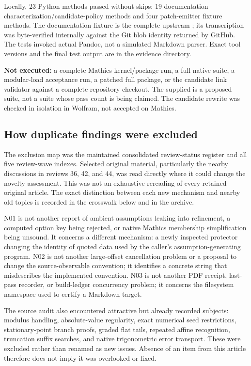 \documentclass[11pt,letterpaper]{article}
\begin{document}
Locally, 23 Python methods passed without skips: 19 documentation
characterization/candidate-policy methods and four patch-emitter fixture
methods. The documentation fixture is the complete upstream
; its transcription was byte-verified
internally against the Git blob identity returned by GitHub. The tests invoked
actual Pandoc, not a simulated Markdown parser. Exact tool versions and the
final test output are in the evidence directory.

\textbf{Not executed:} a complete Mathics kernel/package run, a full native
suite, a modular-load acceptance run, a patched full package, or the candidate
link validator against a complete repository checkout. The supplied
 is a proposed suite, not a suite whose pass
count is being claimed. The candidate rewrite was checked in isolation in
Wolfram, not accepted on Mathics.

\subsection{How duplicate findings were excluded}

The exclusion map was the maintained consolidated review-status register and
all five review-wave indexes. Selected original material, particularly the
nearby discussions in reviews 36, 42, and 44, was read directly where it could
change the novelty assessment. This was not an exhaustive rereading of every
retained original article. The exact distinction between each new mechanism
and nearby old topics is recorded in the crosswalk below and in the archive.
\cite{status,wave3,wave4,wave5,r36,r42,r44}

N01 is not another report of ambient assumptions leaking into refinement, a
computed option key being rejected, or native Mathics membership simplification
being unsound. It concerns a different mechanism: a newly inspected protector
changing the identity of quoted data used by the caller's assumption-generating
program. N02 is not another large-offset cancellation problem or a proposal to
change the source-observable convention; it identifies a concrete string that
misdescribes the implemented convention. N03 is not another PDF receipt,
last-pass recorder, or build-ledger concurrency problem; it concerns the
filesystem namespace used to certify a Markdown target.

The source audit also encountered attractive but already recorded subjects:
modulus handling, absolute-value regularity, exact numerical seed restrictions,
stationary-point branch proofs, graded flat tails, repeated affine recognition,
truncation suffix searches, and native trigonometric error transport. These
were excluded rather than renamed as new issues. Absence of an item from this
article therefore does not imply it was overlooked or fixed.
\end{document}

